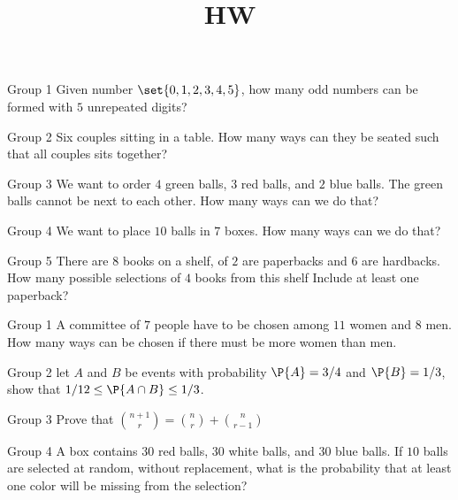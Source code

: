 \documentclass{article}
\title{HW}
\author{}
\date{}
\theoremstyle{plain}
\theoremstyle{definition}
\theoremstyle{remark}
\begin{document}
\maketitle

\begin{problem}
    {Group 1}
    Given number $\set{0,1,2,3,4,5}$, how many odd numbers can be formed with $5$ unrepeated digits?
\end{problem}

\begin{problem}
    {Group 2}
    Six couples sitting in a table. How many ways can they be seated such that all couples sits together?
\end{problem}

\begin{problem}
    {Group 3}
    We want to order $4$ green balls, $3$ red balls, and $2$ blue balls. The green balls cannot be next to each other. How many ways can we do that?
\end{problem}

\begin{problem}
    {Group 4}
    We want to place $10$ balls in $7$ boxes. How many ways can we do that?
\end{problem}

\begin{problem}
    {Group 5}
    There are $8$ books on a shelf, of $2$ are paperbacks and $6$ are hardbacks. How many possible selections of $4$ books from this shelf Include at least one paperback?
\end{problem}
\begin{problem}
    {Group 1}
    A committee of $7$ people have to be chosen among $11$ women and $8$ men. How many ways can be chosen if there must be more women than men.
\end{problem}

\begin{problem}
    {Group 2}
    let $A$ and $B$ be events with probability $\P{A}=3/4$ and $\P{B}=1/3$, show that $1/12\leq \P{A\cap B}\leq 1/3$.
\end{problem}

\begin{problem}
    {Group 3}
    Prove that $\binom{n+1}{r}=\binom{n}{r}+\binom{n}{r-1}$
\end{problem}

\begin{problem}
    {Group 4}
    A box contains $30$ red balls, $30$ white balls, and $30$ blue balls. If $10$ balls are selected at random, without replacement, what is the probability that at least one color will be missing from the selection?
\end{problem}
\end{document}
